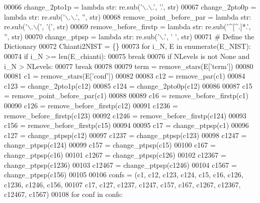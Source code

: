 \begin{DoxyCode}
00066     change\_2pto1p = \textcolor{keyword}{lambda} str: re.sub(\textcolor{stringliteral}{'\(\backslash\).\(\backslash\).'}, \textcolor{stringliteral}{'.'}, str)
00067     change\_2pto0p = \textcolor{keyword}{lambda} str: re.sub(\textcolor{stringliteral}{'\(\backslash\).\(\backslash\).'}, \textcolor{stringliteral}{''}, str)
00068     remove\_point\_before\_par = \textcolor{keyword}{lambda} str: re.sub(\textcolor{stringliteral}{'\(\backslash\).\(\backslash\)('}, \textcolor{stringliteral}{'('}, str)
00069     remove\_before\_firstp = \textcolor{keyword}{lambda} str: re.sub(\textcolor{stringliteral}{'^[^.]*.'}, \textcolor{stringliteral}{''}, str)
00070     change\_ptpsp = \textcolor{keyword}{lambda} str: re.sub(\textcolor{stringliteral}{'\(\backslash\).'}, \textcolor{stringliteral}{' '}, str)
00071     \textcolor{comment}{# Define the Dictionary}
00072     Chianti2NIST = \{\}
00073     \textcolor{keywordflow}{for} i\_N, E \textcolor{keywordflow}{in} enumerate(E\_NIST):
00074         \textcolor{keywordflow}{if} i\_N >= len(E\_chianti):
00075             \textcolor{keywordflow}{break}
00076         \textcolor{keywordflow}{if} NLevels \textcolor{keywordflow}{is} \textcolor{keywordflow}{not} \textcolor{keywordtype}{None} \textcolor{keywordflow}{and} i\_N > NLevels:
00077             \textcolor{keywordflow}{break}
00078         
00079         term = remove\_stars(E[\textcolor{stringliteral}{'term'}])
00080 
00081         c1 = remove\_stars(E[\textcolor{stringliteral}{'conf'}])
00082         
00083         c12 = remove\_par(c1)
00084         c123 = change\_2pto1p(c12)
00085         c124 = change\_2pto0p(c12)
00086         
00087         c15 = remove\_point\_before\_par(c1) 
00088         
00089         c16 = remove\_before\_firstp(c1)
00090         c126 = remove\_before\_firstp(c12)
00091         c1236 = remove\_before\_firstp(c123)
00092         c1246 = remove\_before\_firstp(c124)
00093         c156 = remove\_before\_firstp(c15)
00094         
00095         c17 = change\_ptpsp(c1)
00096         c127 = change\_ptpsp(c12)
00097         c1237 = change\_ptpsp(c123)
00098         c1247 = change\_ptpsp(c124)
00099         c157 = change\_ptpsp(c15)
00100         c167 = change\_ptpsp(c16)
00101         c1267 = change\_ptpsp(c126)
00102         c12367 = change\_ptpsp(c1236)
00103         c12467 = change\_ptpsp(c1246)
00104         c1567 = change\_ptpsp(c156)
00105        
00106         confs = (c1, c12, c123, c124, c15, c16, c126, c1236, c1246, c156,
00107                  c17, c127, c1237, c1247, c157, c167, c1267, c12367, c12467, c1567)
00108         \textcolor{keywordflow}{for} conf \textcolor{keywordflow}{in} confs:   

\end{DoxyCode}
